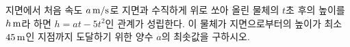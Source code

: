 지면에서 처음 속도 $a\mkern3mu \mathrm{m/s}$로 지면과 수직하게 위로 쏘아 올린 물체의 $t$초 후의 높이를 $h\mkern3mu \mathrm{m}$라 하면 $h=at-5t^2$인 관계가 성립한다. 이 물체가 지면으로부터의 높이가 최소 $45\mkern3mu \mathrm{m}$인 지점까지 도달하기 위한 양수 $a$의 최솟값을 구하시오.
